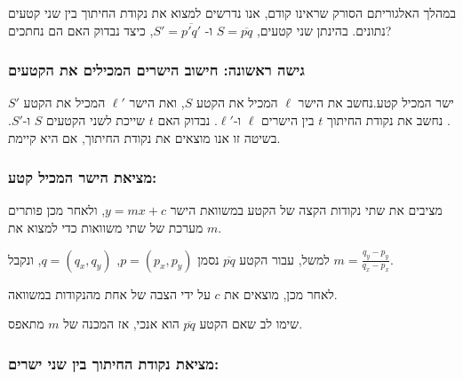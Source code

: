 \documentclass[
]{book}
\begin{document}
במהלך האלגוריתם הסורק שראינו קודם, אנו נדרשים למצוא את נקודת החיתוך בין
שני קטעים נתונים. בהינתן שני קטעים, \(S=\overline{pq}\) ו-
\(S'=\overline{p'q'}\), כיצד נבדוק האם הם נחתכים?

\hypertarget{ux5d2ux5d9ux5e9ux5d4-ux5e8ux5d0ux5e9ux5d5ux5e0ux5d4-ux5d7ux5d9ux5e9ux5d5ux5d1-ux5d4ux5d9ux5e9ux5e8ux5d9ux5dd-ux5d4ux5deux5dbux5d9ux5dcux5d9ux5dd-ux5d0ux5ea-ux5d4ux5e7ux5d8ux5e2ux5d9ux5dd}{%
\subsubsection*{גישה ראשונה: חישוב הישרים המכילים את הקטעים}\label{ux5d2ux5d9ux5e9ux5d4-ux5e8ux5d0ux5e9ux5d5ux5e0ux5d4-ux5d7ux5d9ux5e9ux5d5ux5d1-ux5d4ux5d9ux5e9ux5e8ux5d9ux5dd-ux5d4ux5deux5dbux5d9ux5dcux5d9ux5dd-ux5d0ux5ea-ux5d4ux5e7ux5d8ux5e2ux5d9ux5dd}}

ישר המכיל קטע.נחשב את הישר \(\ell\) המכיל את הקטע \(S\), ואת הישר \(\ell'\)
המכיל את הקטע \(S'\). נחשב את נקודת החיתוך \(t\) בין הישרים \(\ell\)
ו-\(\ell'\). נבדוק האם \(t\) שייכת לשני הקטעים \(S\) ו-\(S'\). בשיטה זו אנו
מוצאים את נקודת החיתוך, אם היא קיימת.

\hypertarget{ux5deux5e6ux5d9ux5d0ux5ea-ux5d4ux5d9ux5e9ux5e8-ux5d4ux5deux5dbux5d9ux5dc-ux5e7ux5d8ux5e2}{%
\subsubsection*{מציאת הישר המכיל קטע:}\label{ux5deux5e6ux5d9ux5d0ux5ea-ux5d4ux5d9ux5e9ux5e8-ux5d4ux5deux5dbux5d9ux5dc-ux5e7ux5d8ux5e2}}

מציבים את שתי נקודות הקצה של הקטע במשוואת הישר \(y=m x + c\), ולאחר מכן
פותרים מערכת של שתי משוואות כדי למצוא את \(m\).

למשל, עבור הקטע \(\overline{pq}\) נסמן \(p=(p_x,p_y)\), \(q=(q_x,q_y)\), ונקבל
\(m=\frac{q_y-p_y}{q_x-p_x}\).

לאחר מכן, מוצאים את \(c\) על ידי הצבה של אחת מהנקודות במשוואה.

שימו לב שאם הקטע \(\overline{p q}\) הוא אנכי, אז המכנה של \(m\) מתאפס.

\hypertarget{ux5deux5e6ux5d9ux5d0ux5ea-ux5e0ux5e7ux5d5ux5d3ux5ea-ux5d4ux5d7ux5d9ux5eaux5d5ux5da-ux5d1ux5d9ux5df-ux5e9ux5e0ux5d9-ux5d9ux5e9ux5e8ux5d9ux5dd}{%
\subsubsection*{מציאת נקודת החיתוך בין שני ישרים:}\label{ux5deux5e6ux5d9ux5d0ux5ea-ux5e0ux5e7ux5d5ux5d3ux5ea-ux5d4ux5d7ux5d9ux5eaux5d5ux5da-ux5d1ux5d9ux5df-ux5e9ux5e0ux5d9-ux5d9ux5e9ux5e8ux5d9ux5dd}}
\end{document}
